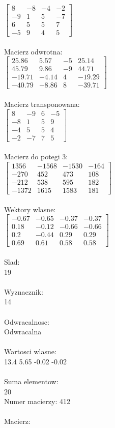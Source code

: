 \documentclass[a4paper,12pt]{article}
\begin{document}
$\begin{bmatrix} 8&-8&-4&-2\\-9&1&5&-7\\6&5&5&7\\-5&9&4&5 \end{bmatrix}$
\\
\\
Macierz odwrotna:\\

$\begin{bmatrix} 25.86&5.57&-5&25.14\\45.79&9.86&-9&44.71\\-19.71&-4.14&4&-19.29\\-40.79&-8.86&8&-39.71 \end{bmatrix}$
\\
\\
Macierz transponowana:\\

$\begin{bmatrix} 8&-9&6&-5\\-8&1&5&9\\-4&5&5&4\\-2&-7&7&5 \end{bmatrix}$
\\
\\
Macierz do potegi 3:\\

$\begin{bmatrix} 1356&-1568&-1530&-164\\-270&452&473&108\\-212&538&595&182\\-1372&1615&1583&181 \end{bmatrix}$
\\
\\
Wektory wlasne:\\

$\begin{bmatrix} -0.67&-0.65&-0.37&-0.37\\0.18&-0.12&-0.66&-0.66\\0.2&-0.44&0.29&0.29\\0.69&0.61&0.58&0.58 \end{bmatrix}$
\\
\\
Slad:\\
19
\\
\\
Wyznacznik:\\
14
\\
\\
Odwracalnosc:\\
Odwracalna
\\
\\
Wartosci wlasne:\\
13.4 5.65 -0.02 -0.02
\\
\\
Suma elementow:\\
20
\\
\newpage
Numer macierzy:
412
\\
\\
Macierz:\\
\end{document}
